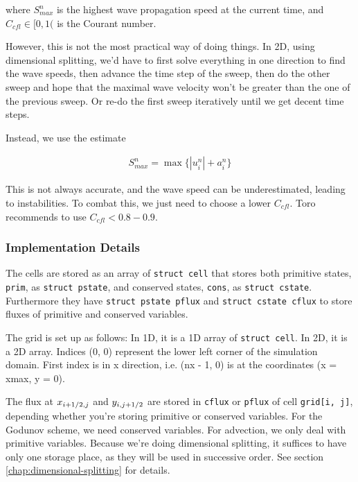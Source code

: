 where $S_{max}^n$ is the highest wave propagation speed at the current time, and $C_{cfl} \in [0, 1($ is the Courant number.


However, this is not the most practical way of doing things.
In 2D, using dimensional splitting, we'd have to first solve everything in one direction to find the wave speeds, then advance the time step of the sweep, then do the other sweep and hope that the maximal wave velocity won't be greater than the one of the previous sweep.
Or re-do the first sweep iteratively until we get decent time steps.

Instead, we use the estimate

\begin{align}
	S^n_{max} = \max\{ |u_i^n| + a_i^n \}
\end{align}

This is not always accurate, and the wave speed can be underestimated, leading to instabilities.
To combat this, we just need to choose a lower $C_{cfl}$.
Toro recommends to use $C_{cfl} < 0.8 - 0.9$.













\subsubsection{Implementation Details}\label{chap:godunov-details}


The cells are stored as an array of \verb|struct cell| that stores both primitive states, \texttt{prim}, as  \texttt{struct pstate}, and conserved states, \texttt{cons}, as \texttt{struct cstate}.
Furthermore they have \texttt{struct pstate pflux} and \texttt{struct cstate cflux} to store fluxes of primitive and conserved variables.


The grid is set up as follows:
In 1D, it is a 1D array of \texttt{struct cell}.
In 2D, it is a 2D array.
Indices (0, 0) represent the lower left corner of the simulation domain.
First index is in x direction, i.e. (nx - 1, 0) is at the coordinates (x = xmax, y = 0).


The flux at $x_{i+1/2, j}$ and $y_{i, j+1/2}$ are stored in \texttt{cflux} or \texttt{pflux} of cell \verb|grid[i, j]|, depending whether you're storing primitive or conserved variables.
For the Godunov scheme, we need conserved variables.
For advection, we only deal with primitive variables.
Because we're doing dimensional splitting, it suffices to have only one storage place, as they will be used in successive order.
See section \ref{chap:dimensional-splitting} for details.

